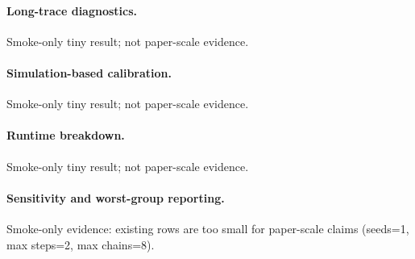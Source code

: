 \paragraph{Long-trace diagnostics.}
Smoke-only tiny result; not paper-scale evidence.


\paragraph{Simulation-based calibration.}
Smoke-only tiny result; not paper-scale evidence.


\paragraph{Runtime breakdown.}
Smoke-only tiny result; not paper-scale evidence.



\paragraph{Sensitivity and worst-group reporting.}
Smoke-only evidence: existing rows are too small for paper-scale claims (seeds=1, max steps=2, max chains=8).




